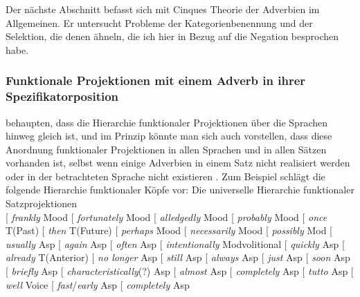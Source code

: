 Der nächste Abschnitt befasst sich mit Cinques Theorie der Adverbien im Allgemeinen. Er untersucht Probleme
der Kategorienbenennung und der Selektion, die denen ähneln, die ich hier in Bezug auf die Negation
besprochen habe.


\subsubsection{Funktionale Projektionen mit einem Adverb in ihrer Spezifikatorposition}
\label{sec-funct-proj-and-adverbs}
\label{sec-major-minor-category}

\citeauthor{CR2010a} behaupten, dass die Hierarchie funktionaler Projektionen über die
Sprachen hinweg gleich ist, und im Prinzip könnte man sich auch vorstellen, dass diese Anordnung funktionaler Projektionen
in allen Sprachen und in allen Sätzen vorhanden ist, selbst wenn einige Adverbien in einem Satz nicht realisiert werden oder
in der betrachteten Sprache nicht existieren \citep[]{CR2010a}. Zum Beispiel schlägt \citet[]{Cinque99a-u} die folgende Hierarchie funktionaler Köpfe vor:
\ea
\label{ex-adjunct-hierarchy}
Die universelle Hierarchie funktionaler Satzprojektionen \citep[]{Cinque99a-u}\\
{}[ \emph{frankly} Mood [ \emph{fortunately} Mood [ \emph{alledgedly}
Mood [ \emph{probably} Mood [ \emph{once} T(Past) [ \emph{then}
T(Future) [ \emph{perhaps}
Mood [ \emph{necessarily} Mood [ \emph{possibly} Mod [ \emph{usually}
Asp [ \emph{again} Asp [ \emph{often} Asp [ \emph{intentionally}
Mod{volitional} [ \emph{quickly} Asp [ \emph{already} T(Anterior) [ \emph{no longer}
Asp [ \emph{still} Asp [ \emph{always} Asp [ \emph{just}
Asp [ \emph{soon} Asp [ \emph{briefly} Asp [
\emph{characteristically}(?) Asp [ \emph{almost} Asp [ \emph{completely}
Asp [ \emph{tutto} Asp [ \emph{well} Voice [ \emph{fast}/\emph{early}
Asp [ \emph{completely} Asp
\z 

